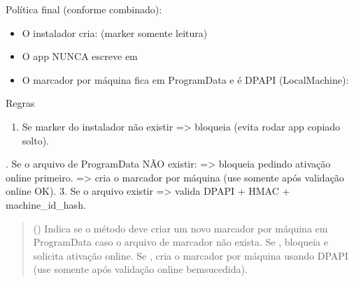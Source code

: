 \documentclass[letterpaper,10pt,english]{sphinxmanual}
\begin{document}

\begin{fulllineitems}
\label{\detokenize{api/simple_lock:simple_lock.ensure_or_mark}}
\pysigstartsignatures
\pysiglinewithargsret
{}
{}
{}
\pysigstopsignatures
\sphinxAtStartPar
Política final (conforme combinado):
\begin{itemize}
\item {} 
\sphinxAtStartPar
O instalador cria:  (marker somente leitura)

\item {} 
\sphinxAtStartPar
O app NUNCA escreve em 

\item {} 
\sphinxAtStartPar
O marcador por máquina fica em ProgramData e é DPAPI (LocalMachine):

\end{itemize}

\sphinxAtStartPar
{}

\sphinxAtStartPar
Regras
\begin{enumerate}
%
\item {} 
\sphinxAtStartPar
Se marker do instalador não existir =\textgreater{} bloqueia (evita rodar app copiado solto).

\end{enumerate}

. Se o arquivo de ProgramData NÃO existir:
\sphinxhyphen{}  =\textgreater{} bloqueia pedindo ativação online primeiro.
\sphinxhyphen{}   =\textgreater{} cria o marcador por máquina (use somente após validação online OK).
3. Se o arquivo existir =\textgreater{} valida DPAPI + HMAC + machine\_id\_hash.
\begin{quote}\begin{description}
\sphinxAtStartPar
{} () \textendash{} Indica se o método deve criar um novo marcador por máquina em ProgramData caso o arquivo
de marcador não exista. Se , bloqueia e solicita ativação online. Se ,
cria o marcador por máquina usando DPAPI (use somente após validação online bem\sphinxhyphen{}sucedida).


\end{description}
\end{quote}
\end{fulllineitems}
\end{document}
